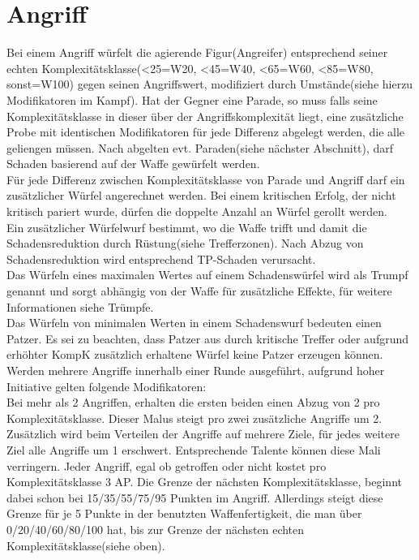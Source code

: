 \documentclass[a4paper,12pt,oneside]{book}
\begin{document}
\section{Angriff}
Bei einem Angriff würfelt die agierende Figur(Angreifer) entsprechend seiner echten Komplexitätsklasse(\textless25=W20, \textless45=W40, \textless65=W60, \textless85=W80, sonst=W100) gegen seinen Angriffswert, modifiziert durch Umstände(siehe hierzu Modifikatoren im Kampf). Hat der Gegner eine Parade, so muss falls seine Komplexitätsklasse in dieser über der Angriffskomplexität liegt, eine zusätzliche Probe mit identischen Modifikatoren für jede Differenz abgelegt werden, die alle geliengen müssen.
Nach abgelten evt. Paraden(siehe nächster Abschnitt), darf Schaden basierend auf der Waffe gewürfelt werden.
\\Für jede Differenz zwischen Komplexitätsklasse von Parade und Angriff darf ein zusätzlicher Würfel angerechnet werden. Bei einem kritischen Erfolg, der nicht kritisch pariert wurde, dürfen die doppelte Anzahl an Würfel gerollt werden.
\\Ein zusätzlicher Würfelwurf bestimmt, wo die Waffe trifft und damit die Schadensreduktion durch Rüstung(siehe Trefferzonen). Nach Abzug von Schadensreduktion wird  entsprechend TP-Schaden verursacht.
\\Das Würfeln eines maximalen Wertes auf einem Schadenswürfel wird als Trumpf genannt und sorgt abhängig von der Waffe für zusätzliche Effekte, für weitere Informationen siehe Trümpfe.
\\Das Würfeln von minimalen Werten in einem Schadenswurf bedeuten einen Patzer. Es sei zu beachten, dass Patzer aus durch kritische Treffer oder aufgrund erhöhter KompK zusätzlich erhaltene Würfel keine Patzer erzeugen können.
\\Werden mehrere Angriffe innerhalb einer Runde ausgeführt, aufgrund hoher Initiative gelten folgende Modifikatoren:
\\Bei mehr als 2 Angriffen, erhalten die ersten beiden einen Abzug von 2 pro Komplexitätsklasse. Dieser Malus steigt pro zwei zusätzliche Angriffe um 2. Zusätzlich wird beim Verteilen der Angriffe auf mehrere Ziele, für jedes weitere Ziel alle Angriffe um 1 erschwert. Entsprechende Talente können diese Mali verringern.
Jeder Angriff, egal ob getroffen oder nicht kostet pro Komplexitätsklasse 3 AP. Die Grenze der nächsten Komplexitätsklasse, beginnt dabei schon bei 15/35/55/75/95 Punkten im Angriff. 
Allerdings steigt diese Grenze für je 5 Punkte in der benutzten Waffenfertigkeit, die man über 0/20/40/60/80/100 hat, bis zur Grenze der nächsten echten Komplexitätsklasse(siehe oben). 
\end{document}
